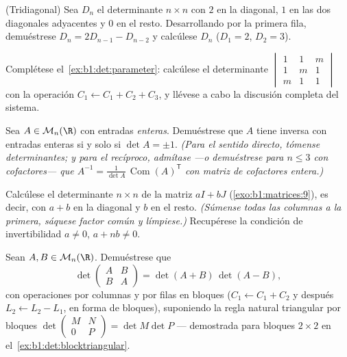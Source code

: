 \begin{exercise}[$\star\star$]\label{exo:b1:det:6}
(Tridiagonal) Sea $D_n$ el determinante $n \times n$ con $2$ en la
diagonal, $1$ en las dos diagonales adyacentes y $0$ en el resto.
Desarrollando por la primera fila, demuéstrese
$D_n = 2D_{n-1} - D_{n-2}$ y calcúlese $D_n$ ($D_1 = 2$, $D_2 = 3$).
\end{exercise}

\begin{exercise}[$\star\star$]\label{exo:b1:det:7}
Complétese el~\cref{ex:b1:det:parameter}: calcúlese el determinante
$\begin{vmatrix} 1 & 1 & m\\ 1 & m & 1\\ m & 1 & 1\end{vmatrix}$ con
la operación $C_1 \leftarrow C_1 + C_2 + C_3$, y llévese a cabo la
discusión completa del sistema.
\end{exercise}

\begin{exercise}[$\star\star$]\label{exo:b1:det:8}
Sea $A \in \mathcal{M}_n(\R)$ con entradas \emph{enteras}.
Demuéstrese que $A$ tiene inversa con entradas enteras si y solo si
$\det A = \pm 1$. \emph{(Para el sentido directo, tómense
determinantes; y para el recíproco, admítase ---o demuéstrese para
$n \leq 3$ con cofactores--- que
$A^{-1} = \frac{1}{\det A}\,\operatorname{Com}(A)^{\mathsf T}$ con
matriz de cofactores entera.)}
\end{exercise}

\begin{exercise}[$\star\star\star$]\label{exo:b1:det:9}
Calcúlese el determinante $n \times n$ de la matriz $aI + bJ$
(\cref{exo:b1:matrices:9}), es decir, con $a + b$ en la diagonal y
$b$ en el resto. \emph{(Súmense todas las columnas a la primera,
sáquese factor común y límpiese.)} Recupérese la condición de
invertibilidad $a \neq 0$, $a + nb \neq 0$.
\end{exercise}

\begin{exercise}[$\star\star\star$]\label{exo:b1:det:10}
Sean $A, B \in \mathcal{M}_n(\R)$. Demuéstrese que
\[
\det\begin{pmatrix} A & B\\ B & A \end{pmatrix}
= \det(A + B)\,\det(A - B),
\]
con operaciones por columnas y por filas en bloques
($C_1 \leftarrow C_1 + C_2$ y después $L_2 \leftarrow L_2 - L_1$, en
forma de bloques), suponiendo la regla natural triangular por bloques
$\det\begin{pmatrix} M & N\\ 0 & P\end{pmatrix} = \det M \det P$ ---
demostrada para bloques $2 \times 2$ en
el~\cref{ex:b1:det:blocktriangular}.
\end{exercise}

